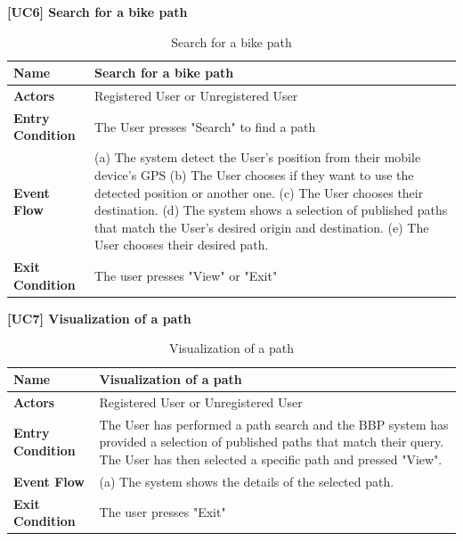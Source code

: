 \documentclass{article}
\begin{document}
\textbf{[UC6] Search for a bike path}
\begin{table}[H]
    \centering
    \begin{tabularx}{\textwidth}{|l|X|}
        \hline
        \textbf{Name} & \textbf{Search for a bike path} \\
        \hline
        \textbf{Actors} & Registered User or Unregistered User\\
        \hline
        \textbf{Entry Condition} & The User presses "Search" to find a path\\
        \hline
        \textbf{Event Flow} & 
        (a) The system detect the User's position from their mobile device's GPS
        \vspace{0.2cm}
        \newline
        (b) The User chooses if they want to use the detected position or another one.
        \vspace{0.2cm}
        \newline
        (c) The User chooses their destination.
        \vspace{0.2cm}
        \newline
        (d) The system shows a selection of published paths that match the User's desired origin and destination. 
        \vspace{0.2cm}
        \newline
        (e) The User chooses their desired path.
        \\
        \hline
        \textbf{Exit Condition} & The user presses "View" or "Exit"\\
        \hline
    \end{tabularx}
    \caption{Search for a bike path}
\end{table}

\textbf{[UC7] Visualization of a path}
\begin{table}[H]
    \centering
    \begin{tabularx}{\textwidth}{|l|X|}
        \hline
        \textbf{Name} & \textbf{Visualization of a path} \\
        \hline
        \textbf{Actors} & Registered User or Unregistered User\\
        \hline
        \textbf{Entry Condition} & The User has performed a path search and the BBP system has provided a selection of published paths that match their query. The User has then selected a specific path and pressed "View".\\
        \hline
        \textbf{Event Flow} & 
        (a) The system shows the details of the selected path.
        \\
        \hline
        \textbf{Exit Condition} & The user presses "Exit"\\
        \hline

    \end{tabularx}
    \caption{Visualization of a path}
\end{table}
\end{document}
